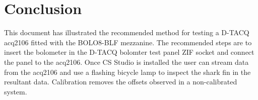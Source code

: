 \documentclass{article}
\begin{document}
\section{Conclusion}
This document has illustrated the recommended method for testing a D-TACQ acq2106 fitted with the BOLO8-BLF mezzanine.
The recommended steps are to insert the bolometer in the D-TACQ bolomter test panel ZIF socket and connect the panel to the acq2106.
Once CS Studio is installed the user can stream data from the acq2106 and use a flashing bicycle lamp to inspect the shark fin in the resultant data. Calibration removes the offsets observed in a non-calibrated system. 
\end{document}
